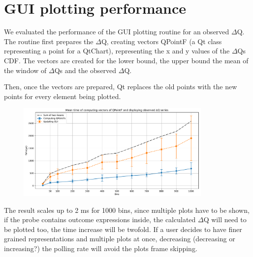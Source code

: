 \section{GUI plotting performance}
    We evaluated the performance of the GUI plotting routine for an observed $\Delta$Q. The routine first prepares the $\Delta$Q, creating vectors QPointF (a Qt class representing a point for a QtChart), representing the x and y values of the $\Delta$Qs CDF. The vectors are created for the lower bound, the upper bound the mean of the window of $\Delta$Qs and the observed $\Delta$Q.

    Then, once the vectors are prepared, Qt replaces the old points with the new points for every element being plotted.

    \begin{figure}[H]
        \begin{center}
            \includegraphics[width = 0.85\textwidth]{img/plots.pdf}
        \end{center}
    \end{figure}

    The result scales up to 2 ms for 1000 bins, since multiple plots have to be shown, if the probe contains outcome expressions inside, the calculated $\Delta$Q will need to be plotted too, the time increase will be twofold. 
    If a user decides to have finer grained representations and multiple plots at once, decreasing (decreasing or increasing?) the polling rate will avoid the plots frame skipping.
